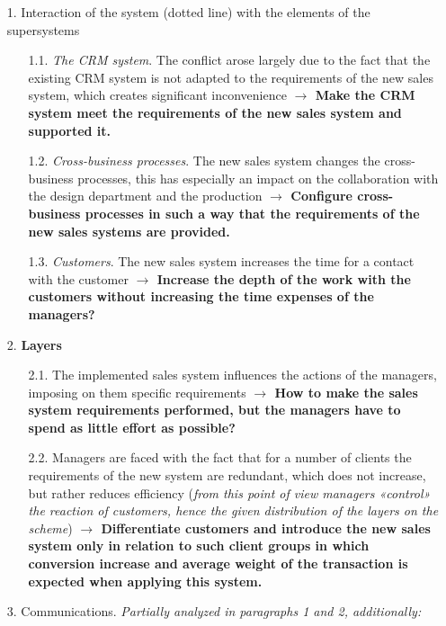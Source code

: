 \documentclass[11pt,a4paper]{book}
\begin{document}
\begin{itemize}
\item[1.] Interaction of the system (dotted line) with the elements of the
  supersystems
  \begin{itemize}
  \item[1.1.]  \emph{The CRM system}. The conflict arose largely due to the
    fact that the existing CRM system is not adapted to the requirements of
    the new sales system, which creates significant inconvenience
    \textbf{$\to$ Make the CRM system meet the requirements of the new sales
      system and supported it.}
  \item [1.2.] \emph{Cross-business processes}. The new sales system changes
    the cross-business processes, this has especially an impact on the
    collaboration with the design department and the production \textbf{$\to$
      Configure cross-business processes in such a way that the requirements
      of the new sales systems are provided.}
  \item [1.3.]  \emph{Customers}. The new sales system increases the time for
    a contact with the customer \textbf{$\to$ Increase the depth of the work
      with the customers without increasing the time expenses of the
      managers?}
  \end{itemize}
\item [2.] \textbf{Layers}
  \begin{itemize}
  \item [2.1.] The implemented sales system influences the actions of the
    managers, imposing on them specific requirements \textbf{$\to$ How to make
      the sales system requirements performed, but the managers have to spend
      as little effort as possible?}
  \item [2.2.] Managers are faced with the fact that for a number of clients
    the requirements of the new system are redundant, which does not increase,
    but rather reduces efficiency (\emph{from this point of view managers
      «control» the reaction of customers, hence the given distribution of the
      layers on the scheme}) \textbf{$\to$ Differentiate customers and
      introduce the new sales system only in relation to such client groups in
      which conversion increase and average weight of the transaction is
      expected when applying this system.}
  \end{itemize}
\item [3.] Communications. \emph{Partially analyzed in paragraphs 1 and 2,
  additionally:}
  \begin{itemize}

\end{itemize}
\end{itemize}
\end{document}
